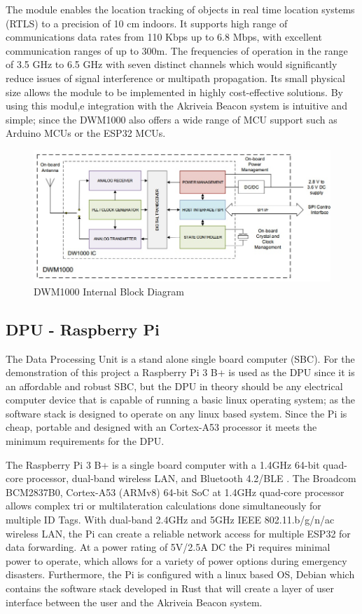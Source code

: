 The module enables the location tracking of objects in real time location systems (RTLS) to a precision of 10 cm indoors. It supports high range of communications data rates from 110 Kbps up to 6.8 Mbps, with excellent communication ranges of up to 300m. The frequencies of operation in the range of 3.5 GHz to 6.5 GHz with seven distinct channels which would significantly reduce issues of signal interference or multipath propagation. Its small physical size allows the module to be implemented in highly cost-effective solutions. By using this modul,e integration with the Akriveia Beacon system is intuitive and simple; since the DWM1000 also offers a wide range of MCU support such as Arduino MCUs or the ESP32 MCUs. 

\medskip
\begin{figure}[H]
\centering
    \includegraphics[scale=0.7]{./images/dwm1000_bd.jpg}
    \caption{DWM1000 Internal Block Diagram}
    \label{dwm1000_bd}
\end{figure}



\pagebreak
\subsection{DPU - Raspberry Pi}
\medskip
The Data Processing Unit is a stand alone single board computer (SBC). For the demonstration of this project a Raspberry Pi 3 B+ is used as the DPU since it is an affordable and robust SBC, but the DPU in theory should be any electrical computer device that is capable of running a basic linux operating system; as the software stack is designed to operate on any linux based system. Since the Pi is cheap, portable and designed with an Cortex-A53 processor it meets the minimum requirements for the DPU.

\bigskip
The Raspberry Pi 3 B+ is a single board computer with a 1.4GHz 64-bit quad-core processor, dual-band wireless LAN, and Bluetooth 4.2/BLE \cite{R3-3-1}. The Broadcom BCM2837B0, Cortex-A53 (ARMv8) 64-bit SoC at 1.4GHz quad-core processor allows complex tri or multilateration calculations done simultaneously for multiple ID Tags. With dual-band 2.4GHz and 5GHz IEEE 802.11.b/g/n/ac wireless LAN, the Pi can create a reliable network access for multiple ESP32 for data forwarding. At a power rating of 5V/2.5A \Gls{DC} the Pi requires minimal power to operate, which allows for a variety of power options during emergency disasters. Furthermore, the Pi is configured with a linux based OS, Debian which contains the software stack developed in Rust that will create a layer of user interface between the user and the Akriveia Beacon system.


